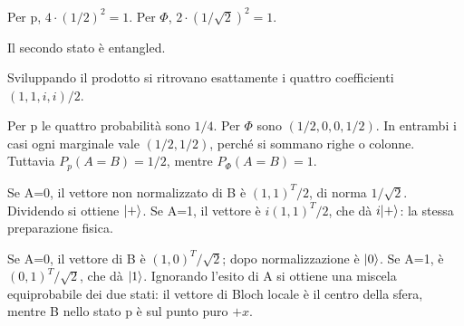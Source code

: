 \ExSolution


Per p, \(4\cdot(1/2)^2=1\). Per \(\Phi\), \(2\cdot(1/\sqrt2)^2=1\).


Il secondo stato è entangled.


Sviluppando il prodotto si ritrovano esattamente i quattro coefficienti \((1,1,i,i)/2\).


Per p le quattro probabilità sono \(1/4\). Per \(\Phi\) sono \((1/2,0,0,1/2)\). In entrambi i casi ogni marginale vale \((1/2,1/2)\), perché si sommano righe o colonne. Tuttavia \(P_p(A=B)=1/2\), mentre \(P_\Phi(A=B)=1\).


Se A=0, il vettore non normalizzato di B è \((1,1)^T/2\), di norma \(1/\sqrt2\). Dividendo si ottiene \(\lvert +\rangle\). Se A=1, il vettore è \(i(1,1)^T/2\), che dà \(i\lvert +\rangle\): la stessa preparazione fisica.


Se A=0, il vettore di B è \((1,0)^T/\sqrt2\); dopo normalizzazione è \(\lvert 0\rangle\). Se A=1, è \((0,1)^T/\sqrt2\), che dà \(\lvert 1\rangle\). Ignorando l’esito di A si ottiene una miscela equiprobabile dei due stati: il vettore di Bloch locale è il centro della sfera, mentre B nello stato p è sul punto puro \(+x\).

